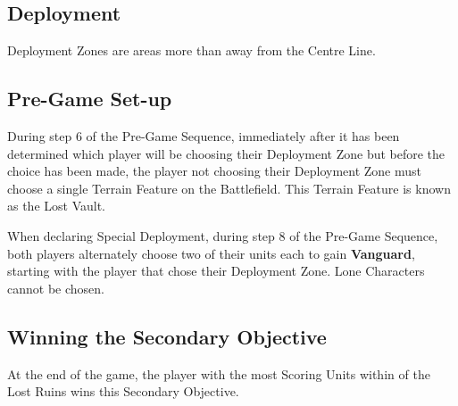 
\label{LostRuins}


\subsection*{Deployment}

Deployment Zones are areas more than  away from the Centre Line.


\subsection*{Pre-Game Set-up}

During step 6 of the Pre-Game Sequence, immediately after it has been determined which player will be choosing their Deployment Zone but before the choice has been made, the player not choosing their Deployment Zone must choose a single Terrain Feature on the Battlefield. This Terrain Feature is known as the Lost Vault.

When declaring Special Deployment, during step 8 of the Pre-Game Sequence, both players alternately choose two of their units each to gain \textbf{Vanguard}, starting with the player that chose their Deployment Zone. Lone Characters cannot be chosen.

\subsection*{Winning the Secondary Objective}

At the end of the game, the player with the most Scoring Units within  of the Lost Ruins wins this Secondary Objective.
